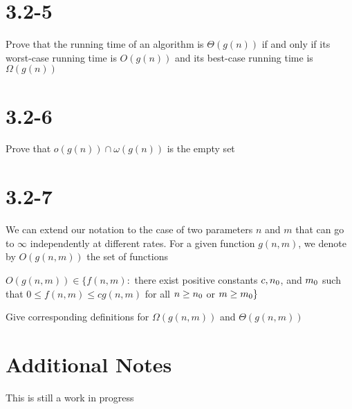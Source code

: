 \documentclass{article}
\begin{document}
\section{3.2-5}
\quad Prove that the running time of an algorithm is $\Theta(g(n))$ if and only if its worst-case running time is $O(g(n))$ and its best-case running time is $\Omega(g(n))$

\section{3.2-6}
\quad Prove that $o(g(n)) \cap \omega(g(n))$ is the empty set

\section{3.2-7}
\quad We can extend our notation to the case of two parameters $n$ and $m$ that can go to $\infty$ independently at different rates. For a given function $g(n,m)$, we denote by $O(g(n,m))$ the set of functions \newline

$O(g(n,m)) \in \{f(n,m) :$ there exist positive constants $c, n\textsubscript{0}$, and $m\textsubscript{0}$ such that $0\leq f(n,m)\leq cg(n,m)$ for all $n\geq n\textsubscript{0}$ or $m\geq m\textsubscript{0}\}$ \newline

Give corresponding definitions for $\Omega(g(n,m))$ and $\Theta(g(n,m))$

\section{Additional Notes}
\quad This is still a work in progress
\end{document}
